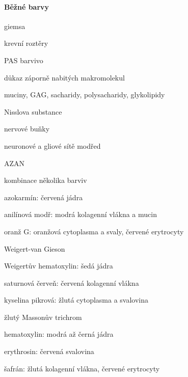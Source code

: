 \documentclass[DIV=8]{scrreprt}
\begin{document}

\paragraph{Běžné barvy}
\begin{myItemize}[nosep]
    \item giemsa
\begin{myItemize}[nosep]
    \item krevní roztěry
\end{myItemize}

    \item PAS barvivo
\begin{myItemize}[nosep]
    \item důkaz záporně nabitých makromolekul
    \item muciny, GAG, sacharidy, polysacharidy, glykolipidy
\end{myItemize}

    \item Nisslova substance
\begin{myItemize}[nosep]
    \item nervové buňky
    \item neuronové a gliové sítě modřed
\end{myItemize}

    \item AZAN
\begin{myItemize}[nosep]
    \item kombinace několika barviv
    \item azokarmín: červená jádra
    \item anilínová modř: modrá kolagenní vlákna a mucin
    \item oranž G: oranžová cytoplasma a svaly, červené erytrocyty
\end{myItemize}

    \item Weigert-van Gieson
\begin{myItemize}[nosep]
    \item Weigertův hematoxylin: šedá jádra
    \item saturnová červeň: červená kolagenní vlákna
    \item kyselina pikrová: žlutá cytoplasma a svalovina
\end{myItemize}

    \item žlutý Massonův trichrom
\begin{myItemize}[nosep]
    \item hematoxylin: modrá až černá jádra
    \item erythrosin: červená svalovina
    \item šafrán: žlutá kolagenní vlákna, červené erytrocyty
\end{myItemize}


\end{myItemize}
\end{document}
